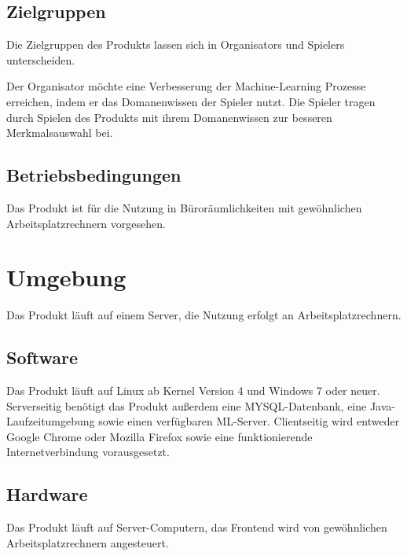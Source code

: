 \documentclass[a4paper]{scrreprt}
\begin{document}
    \section{Zielgruppen}
    Die Zielgruppen des \Gls{Produkt}s lassen sich in \Glspl{Organisator} und \Glspl{Spieler} unterscheiden.

    Der \Gls{Organisator} möchte eine Verbesserung der Machine-Learning Prozesse erreichen, indem er das \Gls{Domanenwissen} der \Gls{Spieler} nutzt.
    Die \Gls{Spieler} tragen durch Spielen des \Gls{Produkt}s mit ihrem \Gls{Domanenwissen} zur besseren Merkmalsauswahl bei.


    \section{Betriebsbedingungen}
    Das \Gls{Produkt} ist für die Nutzung in Büroräumlichkeiten mit gewöhnlichen Arbeitsplatzrechnern vorgesehen.

    \chapter{Umgebung}
    Das \Gls{Produkt} läuft auf einem Server, die Nutzung erfolgt an Arbeitsplatzrechnern.

    \section{Software}
    Das \Gls{Produkt} läuft auf Linux ab Kernel Version 4 und Windows 7 oder neuer.
    Serverseitig benötigt das Produkt außerdem eine MYSQL-Datenbank, eine Java-Laufzeitumgebung sowie einen verfügbaren \Gls{ML-Server}.
    Clientseitig wird entweder Google Chrome oder Mozilla Firefox sowie eine funktionierende Internetverbindung vorausgesetzt.

    \section{Hardware}
    Das \Gls{Produkt} läuft auf Server-Computern, das Frontend wird von gewöhnlichen Arbeitsplatzrechnern angesteuert.
\end{document}
